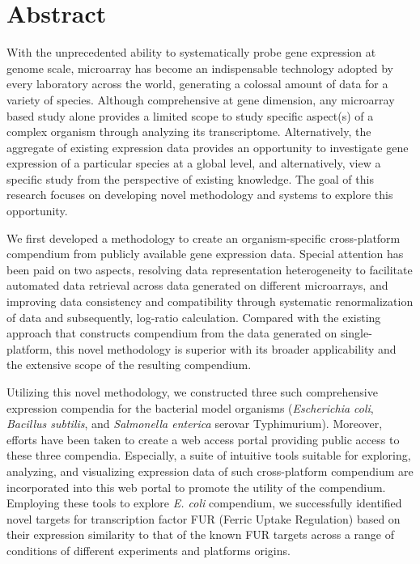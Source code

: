 \chapter{Abstract}                                 \label{ch:abstract}


\instructionsabstract


With the unprecedented ability to systematically probe gene expression at genome scale, microarray has become an indispensable technology adopted by every laboratory across the world, generating a colossal amount of data for a variety of species. Although comprehensive at gene dimension, any microarray based study alone provides a limited scope to study specific aspect(s) of a complex organism through analyzing its transcriptome. Alternatively, the aggregate of existing expression data provides an opportunity to investigate gene expression of a particular species at a global level, and alternatively, view a specific study from the perspective of existing knowledge. The goal of this research focuses on developing novel methodology and systems to explore this opportunity.

We first developed a methodology to create an organism-specific cross-platform compendium from publicly available gene expression data. Special attention has been paid on two aspects, resolving data representation heterogeneity to facilitate automated data retrieval across data generated on different microarrays, and improving data consistency and compatibility through systematic renormalization of data and subsequently, log-ratio calculation. Compared with the existing approach that constructs compendium from the data generated on single-platform, this novel methodology is superior with its broader applicability and the extensive scope of the resulting compendium.

Utilizing this novel methodology, we constructed three such comprehensive expression compendia for the bacterial model organisms (\textit{Escherichia coli}, \textit{Bacillus subtilis}, and \textit{Salmonella enterica} serovar Typhimurium). Moreover, efforts have been taken to create a web access portal providing public access to these three compendia. Especially, a suite of intuitive tools suitable for exploring, analyzing, and visualizing expression data of such cross-platform compendium are incorporated into this web portal to promote the utility of the compendium. Employing these tools to explore \textit{E. coli} compendium, we successfully identified novel targets for transcription factor FUR (Ferric Uptake Regulation) based on their expression similarity to that of the known FUR targets across a range of conditions of different experiments and platforms origins.

